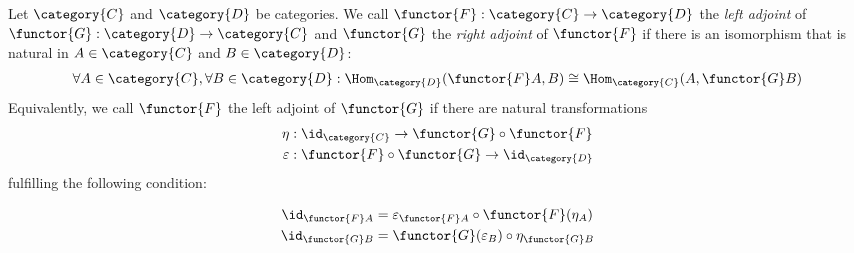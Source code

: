 \documentclass[DIN, pagenumber=false, fontsize=11pt, parskip=half, colorinlistoftodos, svgnames]{scrartcl}
\newcommand{\notimportantnote}[2][]{\todo[color=LightPink, #1]{#2}}
\begin{document}
	

	
	\begin{definition}[Adjunction]
		\label{def: adjunction}
		Let $\category{C}$ and $\category{D} $ be categories. We call $\functor{F}: \category{C} \rightarrow \category{D} $ the \emph{left adjoint} of $\functor{G}: \category{D} \rightarrow \category{C} $ and $\functor{G} $ the \emph{right adjoint} of $\functor{F} $ if there is an isomorphism that is natural in $A \in \category{C} $ and $B \in \category{D} $:
		\begin{align*}
			\forall A \in \category{C}, \forall B \in \category{D}:
			\Hom_\category{D}(\functor{F}A, B) 
			\cong \Hom_\category{C}(A, \functor{G}B)
		\end{align*}
		Equivalently, we call $\functor{F} $ the left adjoint of $\functor{G} $ if there are natural transformations 
		\begin{align*}
			\eta &: \id_\category{C} \rightarrow \functor{G} \circ \functor{F}
			\\
			\varepsilon &: \functor{F} \circ \functor{G} \rightarrow \id_\category{D}
		\end{align*}
		fulfilling the following condition: 
		
		\begin{align*}
			\id_{\functor{F}A} 
			&= \varepsilon_{\functor{F}A} \circ \functor{F}(\eta_A)
			\\
			\id_{\functor{G}B} 
			&= \functor{G}(\varepsilon_B) \circ \eta_{\functor{G}B}
		\end{align*}
		

\end{definition}
\end{document}
